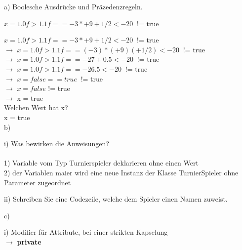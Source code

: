 \documentclass[paper=a4, fontsize=11pt]{scrartcl}
\numberwithin{equation}{section}
\numberwithin{figure}{section}
\numberwithin{table}{section}
\begin{document}
a) Boolesche Ausdrücke und Präzedenzregeln. \\

\begin{center}
$x = 1.0f > 1.1f == -3 * +9 +1/2 <-20 \:$ != true
\end{center}

$x = 1.0f > 1.1f == -3 * +9 +1/2 <-20 \:$ != true \\
$\rightarrow$ $x = 1.0f > 1.1f == (-3) * (+9) (+1/2) <-20 \:$ != true \\
$\rightarrow$ $x = 1.0f > 1.1f == -27 + 0.5 <-20 \:$ != true \\
$\rightarrow$ $x = 1.0f > 1.1f == -26.5 <-20 \:$ != true \\
$\rightarrow$ $x = false == true \:$ != true \\
$\rightarrow$ $x = false $ != true \\
$\rightarrow$ x = true \\

Welchen Wert hat x? \\
x = true \\

b) \\

\begin{flushleft}
i) Was bewirken die Anweisungen? \\
 \\
1) Variable vom Typ Turnierspieler deklarieren ohne einen Wert \\
2) der Variablen maier wird eine neue Instanz der Klasse TurnierSpieler ohne Parameter zugeordnet 
\end{flushleft}

\begin{flushleft}
ii) Schreiben Sie eine Codezeile, welche dem Spieler einen Namen zuweist.
 \\
\end{flushleft}

c) \\

\begin{flushleft}
i) Modifier für Attribute, bei einer strikten Kapselung \\
$\rightarrow$ \textbf{private}
\end{flushleft}
\end{document}
